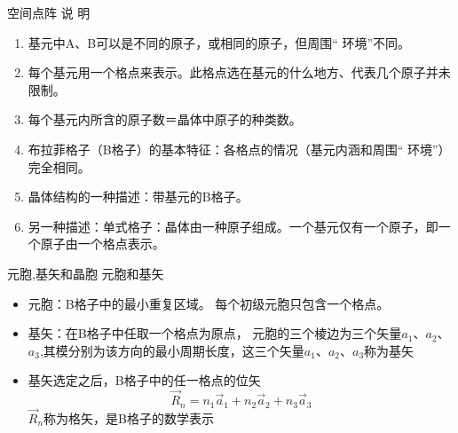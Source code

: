 \documentclass[trans]{beamer} %
\begin{document}
\begin{frame}{空间点阵}
说     明
    \begin{enumerate}[(1)]
        \item <2-|alert@2> 基元中A、B可以是不同的原子，或相同的原子，但周围“  环境”不同。
        \item 每个基元用一个格点来表示。此格点选在基元的什么地方、代表几个原子并未限制。
        \item 每个基元内所含的原子数＝晶体中原子的种类数。
        \item 布拉菲格子（B格子）的基本特征：各格点的情况（基元内涵和周围“  环境”）完全相同。
        \item 晶体结构的一种描述：带基元的B格子。
        \item  另一种描述：单式格子：晶体由一种原子组成。一个基元仅有一个原子，即一个原子由一个格点表示。
    \end{enumerate}


\end{frame}


\begin{frame}{元胞,基矢和晶胞}
元胞和基矢
   

    \begin{itemize}
        \item 元胞：B格子中的最小重复区域。
         每个初级元胞只包含一个格点。
        \item 基矢：在B格子中任取一个格点为原点， 
       元胞的三个棱边为三个矢量$a_1$、$a_2$、$a_3$,其模分别为该方向的最小周期长度，这三个矢量$a_1$、$a_2$、$a_3$称为基矢 
        \item 基矢选定之后，B格子中的任一格点的位矢
        \begin{displaymath}
        \vec{R}_n= n_1\vec{a}_1+ n_2\vec{a}_2+ n_3\vec{a}_3
        \end{displaymath}
 $\vec{R}_n$称为格矢，是B格子的数学表示
    \end{itemize}
\end{frame}
\end{document}

